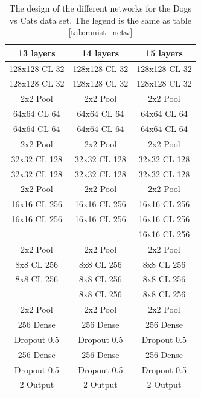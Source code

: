 \documentclass[%
 reprint,
 amsmath,amssymb,
 aps,
]{revtex4-1}
\begin{document}
\begin{table}
\begin{tabular}{c | c | c}
13 layers & 14 layers & 15 layers  \\ \hline\hline
128x128 CL 32 & 128x128 CL 32 & 128x128 CL 32 \\
128x128 CL 32 & 128x128 CL 32 & 128x128 CL 32 \\
2x2 Pool & 2x2 Pool & 2x2 Pool \\
64x64 CL 64 & 64x64 CL 64 & 64x64 CL 64\\
64x64 CL 64 & 64x64 CL 64 & 64x64 CL 64\\
2x2 Pool & 2x2 Pool  & 2x2 Pool \\
32x32 CL 128 & 32x32 CL 128 & 32x32 CL 128\\
32x32 CL 128 & 32x32 CL 128 & 32x32 CL 128\\
 2x2 Pool & 2x2 Pool  & 2x2 Pool \\
16x16 CL 256 & 16x16 CL 256 & 16x16 CL 256\\
16x16 CL 256 & 16x16 CL 256 & 16x16 CL 256\\
 &  & 16x16 CL 256\\
  2x2 Pool & 2x2 Pool  & 2x2 Pool \\
8x8 CL 256 & 8x8 CL 256 & 8x8 CL 256\\
8x8 CL 256 & 8x8 CL 256 & 8x8 CL 256\\
 & 8x8 CL 256 & 8x8 CL 256\\
 2x2 Pool & 2x2 Pool  & 2x2 Pool \\
256 Dense & 256  Dense& 256 Dense\\
Dropout 0.5 & Dropout 0.5 & Dropout 0.5\\
256 Dense & 256  Dense& 256 Dense\\
Dropout 0.5 & Dropout 0.5 & Dropout 0.5\\
2 Output & 2 Output & 2 Output
\end{tabular}
\caption{The design of the different networks for the Dogs vs Cats data set. The legend is the same as table \ref{tab:mnist_netw}}
\label{tab:dvc_netw}
\end{table}
\end{document}
